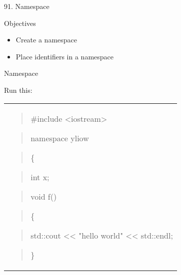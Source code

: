 \documentclass[
]{article}
\author{}
\date{}
\providecommand{\tightlist}{%
  \setlength{\itemsep}{0pt}\setlength{\parskip}{0pt}}
\begin{document}
91. Namespace

Objectives

\begin{itemize}
\tightlist
\item
  Create a namespace
\item
  Place identifiers in a namespace
\end{itemize}

Namespace

\begin{quote}
\end{quote}

Run this:

\begin{longtable}[]{@{}
  >{\raggedright\arraybackslash}p{}@{}}
\toprule\noalign{}
 \\
\midrule\noalign{}
\endhead
\bottomrule\noalign{}
\endlastfoot
\begin{quote}
\#include \textless iostream\textgreater{}
\end{quote}

\begin{quote}
\end{quote}

\begin{quote}
namespace yliow
\end{quote}

\begin{quote}
\{
\end{quote}

\begin{quote}
int x;
\end{quote}

\begin{quote}
\end{quote}

\begin{quote}
void f()
\end{quote}

\begin{quote}
\{
\end{quote}

\begin{quote}
std::cout \textless\textless{} "hello world" \textless\textless{}
std::endl;
\end{quote}

\begin{quote}
\}
\end{quote}

\begin{quote}
\end{quote}


\end{longtable}
\end{document}
